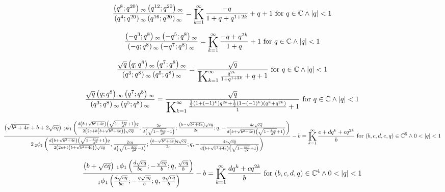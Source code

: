 \documentclass{article}
\newcommand{\bigK}{\mathop{\raisebox{-5pt}{\huge K}}}
\begin{document}
\[\frac{\left(q^8;q^{20}\right){}_{\infty } \left(q^{12};q^{20}\right){}_{\infty }}{\left(q^4;q^{20}\right){}_{\infty } \left(q^{16};q^{20}\right){}_{\infty }}=\bigK_{k=1}^{\infty}\frac{-q}{1+q+q^{1+2 k}}+q+1\text{ for }q\in \mathbb{C}\land \left| q\right| <1\] 

\[\frac{\left(-q^3;q^8\right){}_{\infty } \left(-q^5;q^8\right){}_{\infty }}{\left(-q;q^8\right){}_{\infty } \left(-q^7;q^8\right){}_{\infty }}=\bigK_{k=1}^{\infty}\frac{-q+q^{2 k}}{1+q}+1\text{ for }q\in \mathbb{C}\land \left| q\right| <1\] 

\[\frac{\sqrt{q} \left(q;q^8\right){}_{\infty } \left(q^7;q^8\right){}_{\infty }}{\left(q^3;q^8\right){}_{\infty } \left(q^5;q^8\right){}_{\infty }}=\frac{\sqrt{q}}{\bigK_{k=1}^{\infty}\frac{q^{2 k}}{1+q^{1+2 k}}+q+1}\text{ for }q\in \mathbb{C}\land \left| q\right| <1\] 

\[\frac{\sqrt{q} \left(q;q^8\right){}_{\infty } \left(q^7;q^8\right){}_{\infty }}{\left(q^3;q^8\right){}_{\infty } \left(q^5;q^8\right){}_{\infty }}=\frac{\sqrt{q}}{\bigK_{k=1}^{\infty}\frac{\frac{1}{2} \left(1+(-1)^k\right) q^{2 k}+\frac{1}{2} \left(1-(-1)^k\right) \left(q^k+q^{2 k}\right)}{1}+1}\text{ for }q\in \mathbb{C}\land \left| q\right| <1\] 

\[\frac{\left(\sqrt{b^2+4 e}+b+2 \sqrt{c q}\right) \, _2\phi _1\left(\frac{d \left(b+\sqrt{b^2+4 e}\right) \left(\sqrt{1-\frac{4 c e}{d^2}}+1\right) q}{2 \left(2 e+b \left(b+\sqrt{b^2+4 e}\right)\right) \sqrt{c q}},\frac{2 c}{d \left(\sqrt{1-\frac{4 c e}{d^2}}-1\right)};\frac{\left(b-\sqrt{b^2+4 e}\right) \sqrt{c q}}{2 e};q,-\frac{4 e \sqrt{c q}}{d \left(b+\sqrt{b^2+4 e}\right) \left(\sqrt{1-\frac{4 c e}{d^2}}+1\right)}\right)}{2 \, _2\phi _1\left(\frac{d \left(b+\sqrt{b^2+4 e}\right) \left(\sqrt{1-\frac{4 c e}{d^2}}+1\right) q}{2 \left(2 e+b \left(b+\sqrt{b^2+4 e}\right)\right) \sqrt{c q}},\frac{2 c q}{d \left(\sqrt{1-\frac{4 c e}{d^2}}-1\right)};\frac{\left(b-\sqrt{b^2+4 e}\right) q \sqrt{c q}}{2 e};q,-\frac{4 e \sqrt{c q}}{d \left(b+\sqrt{b^2+4 e}\right) \left(\sqrt{1-\frac{4 c e}{d^2}}+1\right)}\right)}-b=\bigK_{k=1}^{\infty}\frac{e+d q^k+c q^{2 k}}{b}\text{ for }(b,c,d,e,q)\in \mathbb{C}^5\land 0<\left| q\right| <1\] 

\[\frac{\left(b+\sqrt{c q}\right) \, _1\phi _1\left(\frac{d \sqrt{c q}}{b c};-\frac{\sqrt{c q}}{b};q,\frac{\sqrt{c q}}{b}\right)}{\, _1\phi _1\left(\frac{d \sqrt{c q}}{b c};-\frac{q \sqrt{c q}}{b};q,\frac{q \sqrt{c q}}{b}\right)}-b=\bigK_{k=1}^{\infty}\frac{d q^k+c q^{2 k}}{b}\text{ for }(b,c,d,q)\in \mathbb{C}^4\land 0<\left| q\right| <1\] 
\end{document}
